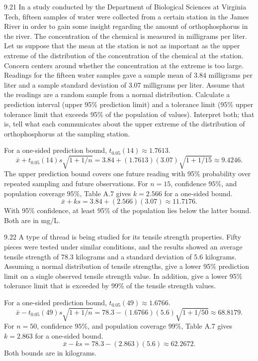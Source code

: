 \documentclass[11pt,oneside]{article}
\begin{document}
\begin{exercise}{9.21}
In a study conducted by the Department of Biological Sciences at Virginia Tech, fifteen samples of water were collected from a certain station in the James River in order to gain some insight regarding the amount of orthophosphorus in the river. The concentration of the chemical is measured in milligrams per liter. Let us suppose that the mean at the station is not as important as the upper extreme of the distribution of the concentration of the chemical at the station. Concern centers around whether the concentration at the extreme is too large. Readings for the fifteen water samples gave a sample mean of 3.84 milligrams per liter and a sample standard deviation of 3.07 milligrams per liter. Assume that the readings are a random sample from a normal distribution. Calculate a prediction interval (upper 95\% prediction limit) and a tolerance limit (95\% upper tolerance limit that exceeds 95\% of the population of values). Interpret both; that is, tell what each communicates about the upper extreme of the distribution of orthophosphorus at the sampling station.
\end{exercise}
\begin{solution}
For a one-sided prediction bound, $t_{0.05}(14)\approx1.7613$. 
\[
\bar x+t_{0.05}(14)s\sqrt{1+1/n}=3.84+(1.7613)(3.07)\sqrt{1+1/15}\approx\boxed{9.4246}.
\]
The upper prediction bound covers one future reading with 95\% probability over repeated sampling and future observations. For $n=15$, confidence $95\%$, and population coverage $95\%$, Table A.7 gives $k=2.566$ for a one-sided bound.
\[
\bar x+ks=3.84+(2.566)(3.07)\approx\boxed{11.7176}.
\]
With 95\% confidence, at least 95\% of the population lies below the latter bound. Both are in mg/L.
\end{solution}

\begin{exercise}{9.22}
A type of thread is being studied for its tensile strength properties. Fifty pieces were tested under similar conditions, and the results showed an average tensile strength of 78.3 kilograms and a standard deviation of 5.6 kilograms. Assuming a normal distribution of tensile strengths, give a lower 95\% prediction limit on a single observed tensile strength value. In addition, give a lower 95\% tolerance limit that is exceeded by 99\% of the tensile strength values.
\end{exercise}
\begin{solution}
For a one-sided prediction bound, $t_{0.05}(49)\approx1.6766$. 
\[
\bar x-t_{0.05}(49)s\sqrt{1+1/n}=78.3-(1.6766)(5.6)\sqrt{1+1/50}\approx\boxed{68.8179}.
\]
For $n=50$, confidence $95\%$, and population coverage $99\%$, Table A.7 gives $k=2.863$ for a one-sided bound.
\[
\bar x-ks=78.3-(2.863)(5.6)\approx\boxed{62.2672}.
\]
Both bounds are in kilograms.
\end{solution}
\end{document}

